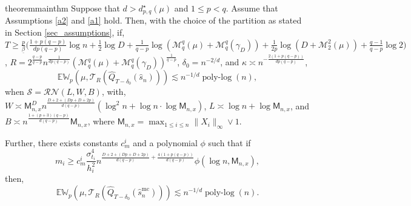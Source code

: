 \documentclass[12pts]{article}
\newcommand{\cN}{ \mathcal{N}}
\newcommand{\cR}{ \mathcal{R}}
\newcommand{\sM}{ \mathscr{M}}
\newcommand{\sS}{ \mathscr{S}}
\newcommand{\sT}{ \mathscr{T}}
\newcommand{\hQ}{ \hat{Q}}
\newcommand{\E}{\mathbb{E}}
\newcommand{\fW}{\mathbb{W}}
\begin{document}
\begin{restatable}{theorem}{mainthm}\label{mainthm}
    Suppose that $d > d^\star_{p, q}(\mu) $ and $1 \le p < q$. Assume that Assumptions \ref{a2} and \ref{a1} hold. Then, with the choice of the partition as stated in Section \ref{sec_assumptions}, if, $T \ge \frac{p}{\underline{\beta}}\bigg( \frac{1 + p(q-p)}{dp(q-p)}\log n + \frac{1}{2} \log D + \frac{1}{q-p} \log( \sM_q^q(\mu) + \sM_q^q(\gamma_D)) 
    + \frac{1}{2p} \log(D + \sM_2^2(\mu)) + \frac{q-1}{q-p} \log 2\bigg)$, 
    $R = 2^{\frac{q-p}{q-p}} n^{\frac{1}{d p (q-p)}} \left(  \sM_q^q(\mu) +   \sM_q^q(\gamma_D) \right)^{\frac{1}{q-p}}$, $\delta_0 = n^{-2/d}$, and $\kappa \asymp  n^{-\frac{2 (1+p(q-p))}{d p (q-p)}} $, 
    \begin{equation}
        \E \fW_p\left(\mu, \sT_R\left(\hQ_{T-\delta_0}(\hat{s}_n)\right)\right) \lesssim n^{-1/d} \operatorname{poly-log}(n), \label{s_n}
    \end{equation}
    when $\sS = \cR\cN(L,W,B)$, with, $W \asymp \mathsf{M}_{n,x}^{D} n^{\frac{D+2 + (Dp + D + 2p)}{d(q-p)}}
\left(\log^2 n + \log n \cdot \log \mathsf{M}_{n,x}\right)$, $L \asymp \log n + \log \mathsf{M}_{n,x}$, and $B \asymp n^{\frac{1+(p+3)(q-p)}{d(q-p)}} \mathsf{M}_{n,x}$, where $\mathsf{M}_{n,x} = \max_{1 \le i \le n} \|X_i\|_\infty \vee 1$.

Further, there exists constants $c_m^i$ and a polynomial $\phi$
such that  if \[m_i \ge c_m^i \frac{\sigma_{t_i}^4}{h_i^2} n^{\frac{D+2 + (Dp + D + 2p)}{d(q-p)} + \frac{4(1+p(q-p))}{d(q-p)}} \phi 
(\log n , \mathsf{M}_{n,x}),\] then, 
\begin{equation}
    \E \fW_p\left(\mu, \sT_R\left(\hQ_{T-\delta_0}(\hat{s}_n^{\text{mc}})\right)\right) \lesssim n^{-1/d} \operatorname{poly-log}(n). \label{s_mc}
\end{equation}
\end{restatable}
\end{document}
